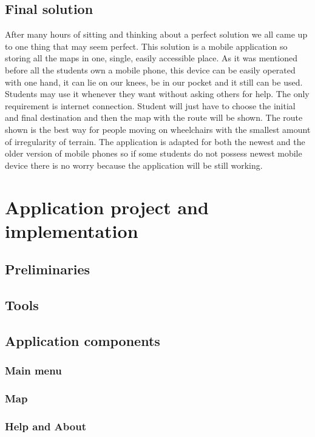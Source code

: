 \documentclass[12pt]{article}
\begin{document}
\subsection{Final solution}
After many hours of sitting and thinking about a perfect solution we all came up to one thing that may seem perfect. This solution is a mobile application so storing all the maps in one, single,  easily accessible place. As it was mentioned before all the students own a mobile phone, this device can be easily operated with one hand, it can lie on our knees, be in our pocket and it still can be used. Students may use it whenever they want without asking others for help. The only requirement is internet connection.  Student will just have to choose the initial and final destination and then the map with the route will be shown. The route shown is the best way for people moving on wheelchairs with the smallest amount of irregularity of terrain. The application is adapted for both the newest and the older version of mobile phones so if some students do not possess newest mobile device there is no worry because the application will be still working. 


\section{Application project and implementation}
\subsection{Preliminaries}
\subsection{Tools}
\subsection{Application components}
\subsubsection{Main menu}
\subsubsection{Map}
\subsubsection{Help and About}
\end{document}
